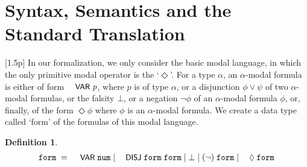 \documentclass{llncs}
\newtheorem{defn}{Definition}[chapter]
\newenvironment{holmath}{\begin{displaymath}\begin{array}{l}}{\end{array}\end{displaymath}\ignorespacesafterend}
\renewcommand{\HOLConst}[1]{{\textsf{\upshape\small #1}}}
\renewcommand{\HOLinline}[1]{\ensuremath{#1}}
\renewcommand{\HOLTokenBar}{\mbox{$|$}}
\begin{document}
\section{Syntax, Semantics and the Standard Translation}[1.5p]
In our formalization, we only consider the basic modal language, in which the only primitive modal operator is the `$\Diamond$'. For a type $\alpha$, an $\alpha$-modal formula is either of form \HOLinline{\HOLConst{VAR}\;\HOLFreeVar{p}}, where $p$ is of type $\alpha$, or a disjunction $\phi\lor \psi$ of two $\alpha$-modal formulas, or the falsity $\bot$, or a negation $\lnot \phi$ of an $\alpha$-modal formula $\phi$, or, finally, of the form $\Diamond \phi$ where $\phi$ is an $\alpha$-modal formula. We create a data type called `form' of the formulas of this modal language. 
\begin{defn}
{\upshape\cite[Definition 1.9]{Blackburn}}
\begin{holmath}
  \HOLTyOp{form}\;=\;\HOLConst{VAR}\;\HOLTyOp{num}\;\HOLTokenBar{}\;\HOLConst{DISJ}\;\HOLTyOp{form}\;\HOLTyOp{form}\;\HOLTokenBar{}\;\HOLSymConst{\ensuremath{\bot}}\;\HOLTokenBar{}\;(\HOLSymConst{\HOLTokenNeg{}})\;\HOLTyOp{form}\;\HOLTokenBar{}\;\HOLConst{\ensuremath{\Diamond}}\;\HOLTyOp{form}
\end{holmath}
\end{defn}
\end{document}
